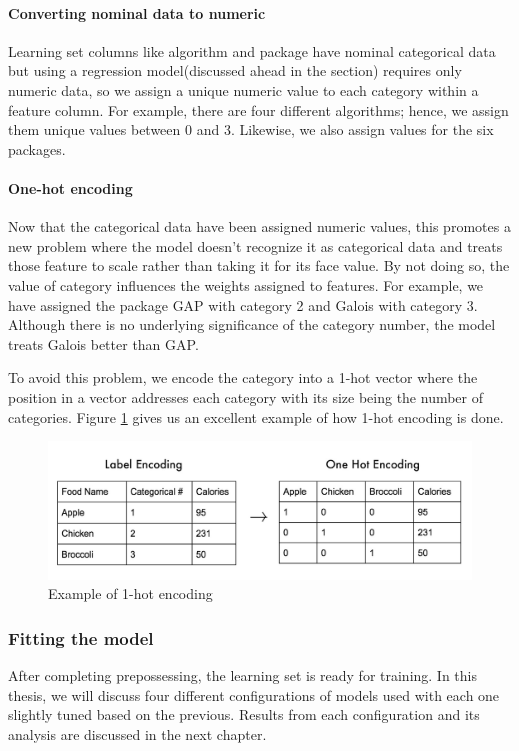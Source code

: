 \paragraph{Converting nominal data to numeric}
Learning set columns like algorithm and package have nominal categorical data but using a regression model(discussed ahead in the section) requires only numeric data, so we assign a unique numeric value to each category within a feature column. For example, there are four different algorithms; hence, we assign them unique values between 0 and 3. Likewise, we also assign values for the six packages.

\paragraph{One-hot encoding}
Now that the categorical data have been assigned numeric values, this promotes a new problem where the model doesn't recognize it as categorical data and treats those feature to scale rather than taking it for its face value. By not doing so, the value of category influences the weights assigned to features. For example, we have assigned the package GAP with category 2 and Galois with category 3. Although there is no underlying significance of the category number, the model treats Galois better than GAP. 

To avoid this problem, we encode the category into a 1-hot vector where the position in a vector addresses each category with its size being the number of categories. Figure \ref{Example of 1-hot encoding} gives us an excellent example of how 1-hot encoding is done.

\begin{figure}
    \centering
    \includegraphics[width=1\columnwidth]{figures/preprocess_1_hot.jpeg}
    \caption{Example of 1-hot encoding}
    \label{Example of 1-hot encoding}
\end{figure}

\subsubsection{Fitting the model}
After completing prepossessing, the learning set is ready for training. In this thesis, we will discuss four different configurations of models used with each one slightly tuned based on the previous. Results from each configuration and its analysis are discussed in the next chapter. 

